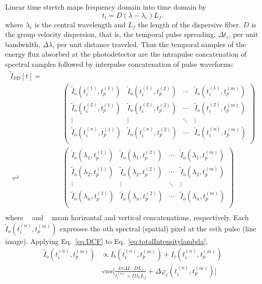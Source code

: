 \documentclass[aps,pra,reprint,longbibliography,superscriptaddress]{revtex4-1}
\DeclareMathOperator{\vercat}{cat_\downarrow} %
\DeclareMathOperator{\horcat}{cat_\rightarrow} %
\begin{document}
Linear time stretch maps frequency domain into time domain by
\begin{equation} \label{eq:DCF}
t_i = D (\lambda - \lambda_c) L_f.
\end{equation}
where $\lambda_c$ is the central wavelength and $L_f$ the length of the dispersive fiber. $D$ is the group velocity dispersion, that is, the temporal pulse spreading, $\Delta t_i$, per unit bandwidth, $\Delta\lambda$, per unit distance traveled. Thus the temporal samples of the energy flux absorbed at the photodetector are the intrapulse concatenation of spectral samples followed by interpulse concatenation of pulse waveforms:
\begin{equation}
\begin{split}
\tilde{I}_{PD}[t] = \quad\quad&\quad\\
\horcat\vercat &
\begin{pmatrix}
\tilde{I}_{o}(t_i^{(1)}, t_p^{(1)})&	\tilde{I}_{o}(t_i^{(1)}, t_p^{(2)})&	\cdots& \tilde{I}_{o}(t_i^{(1)}, t_p^{(m)})\\
\tilde{I}_{o}(t_i^{(2)}, t_p^{(1)})&	\tilde{I}_{o}(t_i^{(2)}, t_p^{(2)})&	\cdots& \tilde{I}_{o}(t_i^{(2)}, t_p^{(m)})\\
\vdots&									\vdots&									\ddots& \vdots								 \\
\tilde{I}_{o}(t_i^{(n)}, t_p^{(1)})&	\tilde{I}_{o}(t_i^{(n)}, t_p^{(2)})&	\cdots& \tilde{I}_{o}(t_i^{(n)}, t_p^{(m)})\\
\end{pmatrix} \\
\rightleftharpoons \horcat\vercat &
\begin{pmatrix}
\tilde{I}_{o}(\lambda_1, t_p^{(1)})  &\tilde{I}_{o}(\lambda_1, t_p^{(2)})   &\cdots  &\tilde{I}_{o}(\lambda_1, t_p^{(m)})\\
\tilde{I}_{o}(\lambda_2, t_p^{(1)})  &\tilde{I}_{o}(\lambda_2, t_p^{(2)})   &\cdots  &\tilde{I}_{o}(\lambda_2, t_p^{(m)})\\
\vdots						   		 &\vdots							    	&\ddots  &\vdots					 \\
\tilde{I}_{o}(\lambda_n, t_p^{(1)})  &\tilde{I}_{o}(\lambda_n, t_p^{(2)})   &\cdots  &\tilde{I}_{o}(\lambda_n, t_p^{(m)})\\
\end{pmatrix} \\
\end{split}
\end{equation}
where $\horcat$ and $\vercat$ mean horizontal and vertical concatenations, respectively. Each $\tilde{I}_{o}(t_i^{(n)}, t_p^{(m)})$ expresses the $n$th spectral (spatial) pixel at the $m$th pulse (line image). Applying Eq.~\ref{eq:DCF} to Eq.~\ref{eq:totalIntensitylambda},
\begin{equation}\label{eq:afterDCF}
\begin{split}
\tilde{I}_{o}(t_i^{(n)}, t_p^{(m)}) & \propto I_b (t_i^{(n)}, t_p^{(m)}) + I_i (t_i^{(n)}, t_p^{(m)}) \\
& \cdot cos\Bigg[ \frac{4\pi\Delta L \cdot D L_f}{t_i^{(n)} + D\lambda_c L_f} + \Delta \varphi_c(t_i^{(n)}, t_p^{(m)}) \Bigg]
\end{split}
\end{equation}
\end{document}

